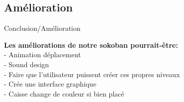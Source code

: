 \documentclass{beamer}
\begin{document}
\subsection{Amélioration}
\begin{frame}{Conclusion/Amélioration}

\textbf{Les améliorations de notre sokoban pourrait-être:}\\
 - Animation déplacement \\
 - Sound design \\
 - Faire que l'utilisateur puissent créer ces propres niveaux \\
 - Crée une interface graphique \\
 - Caisse change de couleur si bien placé
\end{frame}
\end{document}

